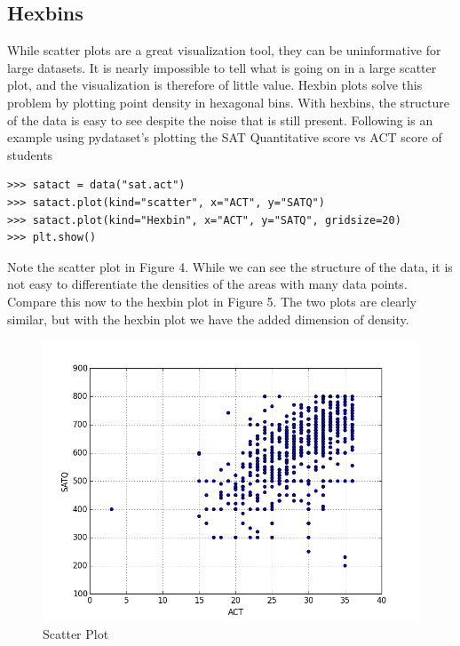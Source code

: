 \subsection*{Hexbins}
While scatter plots are a great visualization tool, they can be uninformative for large datasets.  It is nearly impossible to tell what is going on in a large scatter plot, and the visualization is therefore of little value.  Hexbin plots solve this problem by plotting point density in hexagonal bins.  With hexbins, the structure of the data is easy to see despite the noise that is still present. 
Following is an example using pydataset's  plotting the SAT Quantitative score vs ACT score of students


\begin{lstlisting}
>>> satact = data("sat.act")
>>> satact.plot(kind="scatter", x="ACT", y="SATQ")
>>> satact.plot(kind="Hexbin", x="ACT", y="SATQ", gridsize=20)
>>> plt.show()
\end{lstlisting}

Note the scatter plot in Figure 4. While we can see the structure of the data, it is not easy to differentiate the densities of the areas with many data points. Compare this now to the hexbin plot in Figure 5.  The two plots are clearly similar, but with the hexbin plot we have the added dimension of density.   
\begin{figure}[H] 
    \centering
    \includegraphics[width=.75\textwidth]{scatter.png}
    \caption{Scatter Plot}
\end{figure}

